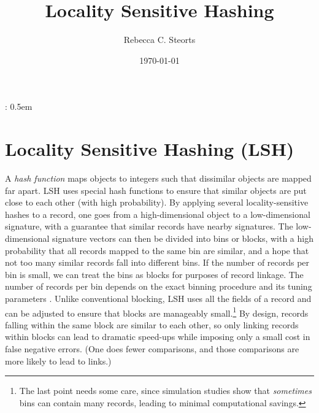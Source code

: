 \documentclass[11pt]{article}
\title{Locality Sensitive Hashing}
\author{Rebecca C. Steorts}
\date{\today  }
\begin{document}
\newtheorem{lemma}{Lemma}
\newtheorem{theorem}{Theorem}
\newtheorem{corollary}{Corollary}

\theoremstyle{definition}
\newtheorem{definition}{Definition}
\newtheorem*{remark}{Remark}

{\topsep} %
{\topsep} %
{\it} %
{} %
{\bf} %
{:} %
{0.5em} %
{} %
\theoremstyle{lemma}
\newtheorem{lem}{Lemma}

%

\maketitle




\section{Locality Sensitive Hashing (LSH)}

A {\em hash function} maps objects to integers such that
dissimilar objects are mapped far apart.  LSH uses special hash functions to
ensure that similar objects are put close to each other (with high
probability).  By applying several locality-sensitive hashes to a record, one
goes from a high-dimensional object to a low-dimensional signature, with a
guarantee that similar records have nearby signatures.  The low-dimensional
signature vectors can then be divided into bins or blocks, with a high
probability that all records mapped to the same bin are similar, and a hope
that not too many similar records fall into different bins.  If the number of
records per bin is small, we can treat the bins as blocks for purposes of
record linkage.  The number of records per bin depends on the exact binning
procedure and its tuning parameters \citep{kim_2010, rajaraman_2012,
  christen_2011}.  Unlike conventional blocking, LSH uses all the fields of a
record and can be adjusted to ensure that blocks are manageably
small.\footnote{The last point needs some care, since simulation studies show
  that \emph{sometimes} bins can contain many records, leading to minimal
  computational savings.}  By design, records falling within the same block are
similar to each other, so only linking records within blocks can lead to
dramatic speed-ups while imposing only a small cost in false negative errors.
(One does fewer comparisons, and those comparisons are more likely to lead to
links.)
\end{document}
